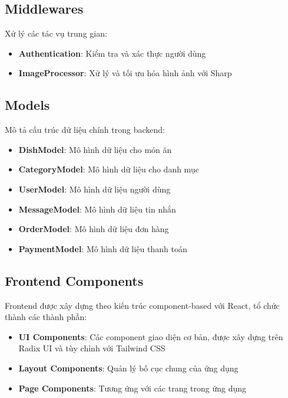 \subsection{Middlewares}
Xử lý các tác vụ trung gian:
\begin{itemize}
    \item \textbf{Authentication}: Kiểm tra và xác thực người dùng
    \item \textbf{ImageProcessor}: Xử lý và tối ưu hóa hình ảnh với Sharp
\end{itemize}

\subsection{Models}
Mô tả cấu trúc dữ liệu chính trong backend:
\begin{itemize}
    \item \textbf{DishModel}: Mô hình dữ liệu cho món ăn
    \item \textbf{CategoryModel}: Mô hình dữ liệu cho danh mục
    \item \textbf{UserModel}: Mô hình dữ liệu người dùng
    \item \textbf{MessageModel}: Mô hình dữ liệu tin nhắn
    \item \textbf{OrderModel}: Mô hình dữ liệu đơn hàng
    \item \textbf{PaymentModel}: Mô hình dữ liệu thanh toán
\end{itemize}

\subsection{Frontend Components}
Frontend được xây dựng theo kiến trúc component-based với React, tổ chức thành các thành phần:
\begin{itemize}
    \item \textbf{UI Components}: Các component giao diện cơ bản, được xây dựng trên Radix UI và tùy chỉnh với Tailwind CSS
    \item \textbf{Layout Components}: Quản lý bố cục chung của ứng dụng
    \item \textbf{Page Components}: Tương ứng với các trang trong ứng dụng
\end{itemize}

